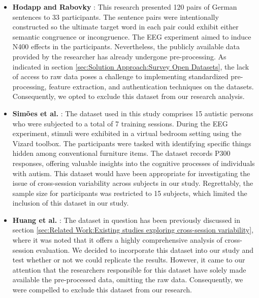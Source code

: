 \begin{itemize}


\item \textbf{Hodapp and Rabovky } \cite{rabs2022situational}: This research presented 120 pairs of German sentences to 33 participants. The sentence pairs were intentionally constructed so the ultimate target word in each pair could exhibit either semantic congruence or incongruence. The EEG experiment aimed to induce N400 effects in the participants. Nevertheless, the publicly available data provided by the researcher has already undergone pre-processing. As indicated in section \ref{sec:Solution Approach:Survey Open Datasets}, the lack of access to raw data poses a challenge to implementing standardized pre-processing, feature extraction, and authentication techniques on the datasets. Consequently, we opted to exclude this dataset from our research analysis.         


\item \textbf{Simões et al.} \cite{simoes2020bciaut}: The dataset used in this study comprises 15 autistic persons who were subjected to a total of 7 training sessions. During the EEG experiment, stimuli were exhibited in a virtual bedroom setting using the Vizard toolbox. The participants were tasked with identifying specific things hidden among conventional furniture items. The dataset records P300 responses, offering valuable insights into the cognitive processes of individuals with autism. This dataset would have been appropriate for investigating the issue of cross-session variability across subjects in our study. Regrettably, the sample size for participants was restricted to 15 subjects, which limited the inclusion of this dataset in our study.

\item \textbf{Huang et al.} \cite{huang2022m3cv}: The dataset in question has been previously discussed in section \ref{sec:Related Work:Existing studies exploring cross-session variability}, where it was noted that it offers a highly comprehensive analysis of cross-session evaluation. We decided to incorporate this dataset into our study and test whether or not we could replicate the results. However, it came to our attention that the researchers responsible for this dataset have solely made available the pre-processed data, omitting the raw data. Consequently, we were compelled to exclude this dataset from our research.


\end{itemize}
